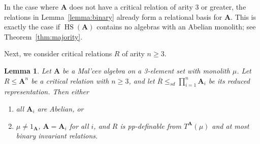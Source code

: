 \documentclass[12pt]{amsart}
\newtheorem{lemma}[theorem]{Lemma}
\theoremstyle{definition}
\theoremstyle{definition}
\newcommand{\alg}[1]{\mathbf{#1}}
\newcommand{\algA}{\alg{A}}
\DeclareMathOperator{\HS}{HS}
\begin{document}
In the case where $\alg{A}$ does not have a critical relation of arity $3$ or greater, the relations in Lemma~\ref{lemma:binary} already form a relational basis for $\alg{A}$. This is exactly the case if $\HS(\alg{A})$ contains no algebras with an Abelian monolith; see Theorem~\ref{thm:majority}.

Next, we consider critical relations $R$ of arity $n\geq 3$.

\begin{lemma}\label{lemma:critical1}
Let $\algA$ be a Mal'cev algebra on a 3-element set with monolith $\mu$. Let $R\leq \alg{A}^n$ be a critical relation with $n\geq 3$, and let $\overline{R} \leq_{sd} \prod_{i=1}^n \alg{A}_i$ be its reduced representation. Then either
\begin{enumerate}
\item all $\alg{A}_i$ are Abelian, or
\item $\mu\neq 1_{\alg{A}}$, $\alg{A} = \alg{A}_i$ for all $i$, and $R$ is pp-definable from $T^\alg{A}(\mu)$ and at most binary invariant relations.
\end{enumerate}
\end{lemma}
\end{document}
